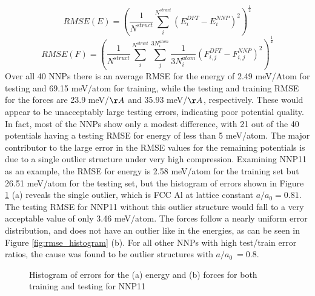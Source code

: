 \documentclass{article}
\begin{document}
\begin{equation}
    RMSE(E) = (\frac{1}{N^{struct}}\sum_i^{N^{struct}} (E^{DFT}_i - E^{NNP}_i)^2)^\frac{1}{2}
\end{equation}
\begin{equation}
        RMSE(F) = (\frac{1}{N^{struct}}\sum_i^{N^{struct}}\sum_j^{3N^{atom}_i}\frac{1}{3N^{atom}_i} (F^{DFT}_{i,j} - F^{NNP}_{i,j})^2)^\frac{1}{2}
\end{equation}
Over all 40 NNPs there is an average RMSE for the energy of 2.49 meV/Atom for testing and 69.15 meV/atom for training, while the testing and training RMSE for the forces are 23.9 meV/$\AA$ and 35.93 meV/$\AA$, respectively.  These would appear to be unacceptably large testing errors, indicating poor potential quality.  In fact, most of the NNPs show only a modest difference, with 21 out of the 40 potentials having a testing RMSE for energy of less than 5 meV/atom.  The major contributor to the large error in the RMSE values for the remaining potentials is due to a single outlier structure under very high compression.  Examining NNP11 as an example, the  RMSE for energy is 2.58 meV/atom for the training set but 26.51 meV/atom for the testing set, but the histogram of errors shown in Figure \ref{fig:rsme_histogram} (a) reveals the single outlier, which is FCC Al at lattice constant $a/a_0 =0.81$.   The testing RMSE for NNP11 without this outlier structure would fall to a very acceptable value of only 3.46 meV/atom. The forces follow a nearly uniform error distribution, and does not have an outlier like in the energies, as can be seen in Figure \ref{fig:rmse_histogram} (b).  
For all other NNPs with high test/train error ratios, the cause was found to be outlier structures with $a/a_0 ~= 0.8$. 

\begin{figure}[H]%
\centering%
%
%
\caption{Histogram of errors for the (a) energy and  (b) forces for both training and testing for NNP11}
\label{fig:rsme_histogram}
\end{figure}
\end{document}
